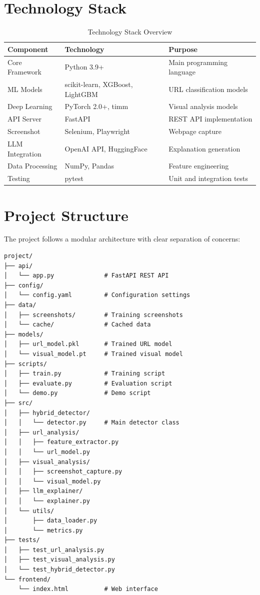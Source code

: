 \documentclass[12pt,a4paper]{report}
\begin{document}
\section{Technology Stack}

\begin{table}[h!]
\centering
\caption{Technology Stack Overview}
\label{tab:tech_stack}
\begin{tabular}{|l|l|l|}
\hline
\textbf{Component} & \textbf{Technology} & \textbf{Purpose} \\
\hline
Core Framework & Python 3.9+ & Main programming language \\
ML Models & scikit-learn, XGBoost, LightGBM & URL classification models \\
Deep Learning & PyTorch 2.0+, timm & Visual analysis models \\
API Server & FastAPI & REST API implementation \\
Screenshot & Selenium, Playwright & Webpage capture \\
LLM Integration & OpenAI API, HuggingFace & Explanation generation \\
Data Processing & NumPy, Pandas & Feature engineering \\
Testing & pytest & Unit and integration tests \\
\hline
\end{tabular}
\end{table}

\section{Project Structure}

The project follows a modular architecture with clear separation of concerns:

\begin{lstlisting}[caption=Project Directory Structure]
project/
├── api/
│   └── app.py              # FastAPI REST API
├── config/
│   └── config.yaml         # Configuration settings
├── data/
│   ├── screenshots/        # Training screenshots
│   └── cache/              # Cached data
├── models/
│   ├── url_model.pkl       # Trained URL model
│   └── visual_model.pt     # Trained visual model
├── scripts/
│   ├── train.py            # Training script
│   ├── evaluate.py         # Evaluation script
│   └── demo.py             # Demo script
├── src/
│   ├── hybrid_detector/
│   │   └── detector.py     # Main detector class
│   ├── url_analysis/
│   │   ├── feature_extractor.py
│   │   └── url_model.py
│   ├── visual_analysis/
│   │   ├── screenshot_capture.py
│   │   └── visual_model.py
│   ├── llm_explainer/
│   │   └── explainer.py
│   └── utils/
│       ├── data_loader.py
│       └── metrics.py
├── tests/
│   ├── test_url_analysis.py
│   ├── test_visual_analysis.py
│   └── test_hybrid_detector.py
└── frontend/
    └── index.html          # Web interface
\end{lstlisting}
\end{document}
